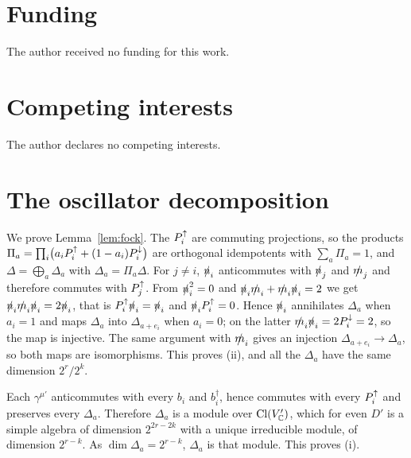 \section*{Funding}

The author received no funding for this work.

\section*{Competing interests}

The author declares no competing interests.

\appendix
{}
\renewcommand{\thefigure}{\Alph{section}.\arabic{figure}}
\renewcommand{\thetable}{\Alph{section}.\arabic{table}}
\renewcommand{\theequation}{\Alph{section}.\arabic{equation}}

\section{The oscillator decomposition}
\label{app:fock}

We prove Lemma~\ref{lem:fock}. The $P^{\uparrow}_i$ are commuting projections, so the products $\Pi_a=\prod_i\bigl(a_iP^{\uparrow}_i+(1-a_i)P^{\downarrow}_i\bigr)$ are orthogonal idempotents with $\sum_a\Pi_a=1$, and $\Delta=\bigoplus_a\Delta_a$ with $\Delta_a=\Pi_a\Delta$. For $j\ne i$, $\slashed{n}_i$ anticommutes with $\slashed{n}_j$ and $\slashed{m}_j$ and therefore commutes with $P^{\uparrow}_j$. From $\slashed{n}_i^2=0$ and $\slashed{n}_i\slashed{m}_i+\slashed{m}_i\slashed{n}_i=2$ we get $\slashed{n}_i\slashed{m}_i\slashed{n}_i=2\slashed{n}_i$, that is $P^{\uparrow}_i\slashed{n}_i=\slashed{n}_i$ and $\slashed{n}_iP^{\uparrow}_i=0$. Hence $\slashed{n}_i$ annihilates $\Delta_a$ when $a_i=1$ and maps $\Delta_a$ into $\Delta_{a+e_i}$ when $a_i=0$; on the latter $\slashed{m}_i\slashed{n}_i=2P^{\downarrow}_i=2$, so the map is injective. The same argument with $\slashed{m}_i$ gives an injection $\Delta_{a+e_i}\to\Delta_a$, so both maps are isomorphisms. This proves (ii), and all the $\Delta_a$ have the same dimension $2^r/2^k$.

Each $\gamma^{\mu'}$ anticommutes with every $b_i$ and $b_i^\dagger$, hence commutes with every $P^{\uparrow}_i$ and preserves every $\Delta_a$. Therefore $\Delta_a$ is a module over $\operatorname{Cl}(V'_{\mathbb{C}})$, which for even $D'$ is a simple algebra of dimension $2^{2r-2k}$ with a unique irreducible module, of dimension $2^{r-k}$. As $\dim\Delta_a=2^{r-k}$, $\Delta_a$ is that module. This proves (i).


